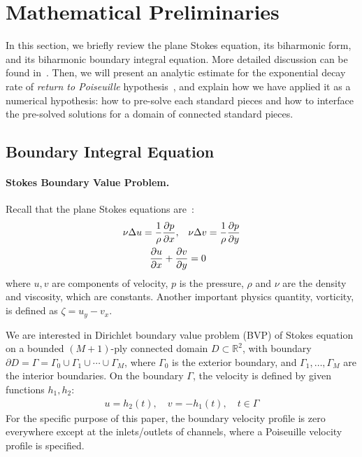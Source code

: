\documentclass[10pt,twocolumn,letterpaper]{article}
\begin{document}
\section{Mathematical Preliminaries\label{mathprelim}}

In this section, we briefly review the plane Stokes equation, its biharmonic
form, and its biharmonic boundary integral equation. More detailed discussion
can be found in~\cite{greengardIntegralEquationMethods1996}. Then, we will
present an analytic estimate for the exponential decay rate of \textit{return
  to Poiseuille} hypothesis~\cite{gregoryTractionBoundaryValue1980}, and explain
how we have applied it as a numerical hypothesis: how to pre-solve each
standard pieces and how to interface the pre-solved solutions for a domain of
connected standard pieces.

\subsection{Boundary Integral Equation}

\paragraph{Stokes Boundary Value Problem.}

Recall that the plane Stokes equations are~\cite{ladyzhenskayaMathematicalTheoryViscous1964}:
\begin{align}
  \nu \Delta u = \frac 1 \rho \pdv{p}{x},\quad & \nu \Delta v = \frac 1\rho \pdv{p}{y}
  \label{stokes}                                                                       \\
  \pdv{u}{x} + \pdv{v}{y}                      & = 0
  \label{continuity}
\end{align}
where $u,v$ are components of velocity, $p$ is the pressure,
$\rho$ and $\nu$ are the density and viscosity, which are constants.
Another important physics quantity, vorticity, is defined as $\zeta  = u_y - v_x$.

We are interested in Dirichlet boundary value problem (BVP) of Stokes equation
on a bounded $(M+1)$-ply connected domain $D\subset \mathbb R^2$, with boundary
$\partial D = \Gamma = \Gamma_0 \cup \Gamma_1 \cup \cdots \cup \Gamma_M$, where
$\Gamma_0$ is the exterior boundary, and $\Gamma_1,\ldots, \Gamma_M$ are the
interior boundaries. On the boundary $\Gamma$, the velocity is defined by given
functions $h_1,h_2$:
\begin{align}
  u = h_2(t),\quad v = - h_1(t), \quad t\in \Gamma
  \label{bdr-velocity}
\end{align}
For the specific purpose of this paper,
the boundary velocity profile is zero everywhere except at the inlets/outlets
of channels, where a Poiseuille velocity profile is specified.
\end{document}
